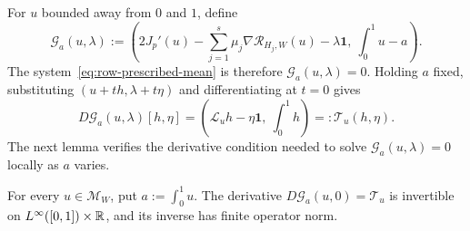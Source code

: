 For $u$ bounded away from $0$ and $1$, define
\[
  \mathcal G_a(u,\lambda):=
  \left(2J_p'(u)-\sum_{j=1}^s\mu_j\nabla\mathcal R_{H_j,W}(u)
    -\lambda\mathbf1,\ \int_0^1u-a\right).
\]
The system~\eqref{eq:row-prescribed-mean} is therefore
$\mathcal G_a(u,\lambda)=0$.
Holding $a$ fixed, substituting $(u+th,\lambda+t\eta)$ and differentiating
at $t=0$ gives
\[
  D\mathcal G_a(u,\lambda)[h,\eta]
  =\left(\mathcal L_uh-\eta\mathbf1,\ \int_0^1h\right)
  =:\mathcal T_u(h,\eta).
\]
The next lemma verifies the derivative condition needed to solve
$\mathcal G_a(u,\lambda)=0$ locally as $a$ varies.

\begin{lemma}\label{lem:bordered}
For every $u\in\mathcal M_W$, put $a:=\int_0^1u$.
The derivative $D\mathcal G_a(u,0)=\mathcal T_u$ is invertible on
$L^\infty([0,1])\times\mathbb R$, and its inverse has finite operator norm.
\end{lemma}


